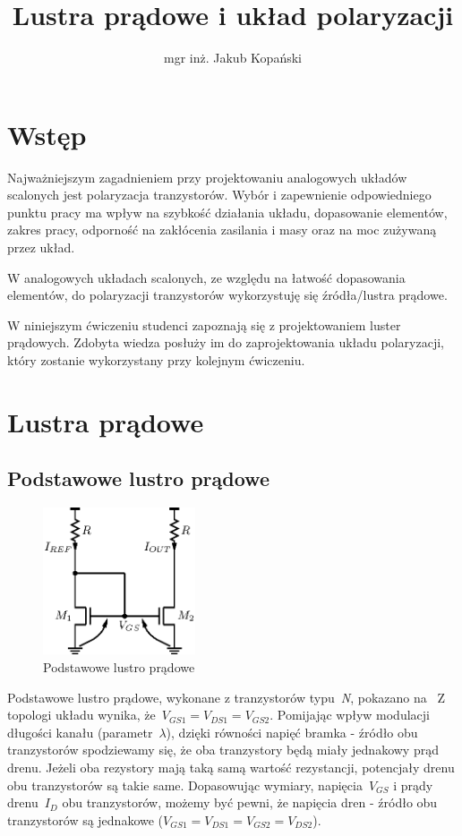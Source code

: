 \documentclass[twoside,pl,final]{labman}
\title{Lustra prądowe i układ polaryzacji}
\author{mgr inż. Jakub Kopański}
\begin{document}
\maketitle
\tableofcontents
\clearpage
\listoffigures
\clearpage
\listoftables
\clearpage

\chapter{Wstęp}
\label{intro}
Najważniejszym zagadnieniem przy projektowaniu
analogowych układów scalonych jest polaryzacja tranzystorów.
Wybór i zapewnienie odpowiedniego punktu pracy
ma wpływ na szybkość działania układu,
dopasowanie elementów, zakres pracy,
odporność na zakłócenia zasilania i masy
oraz na moc zużywaną przez układ.

W analogowych układach scalonych,
ze względu na łatwość dopasowania elementów,
do polaryzacji tranzystorów wykorzystuję się źródła/lustra prądowe.

W niniejszym ćwiczeniu studenci zapoznają się
z projektowaniem luster prądowych.
Zdobyta wiedza posłuży im do zaprojektowania układu polaryzacji,
który zostanie wykorzystany przy kolejnym ćwiczeniu.

\chapter{Lustra prądowe}
\label{mirror}

\section{Podstawowe lustro prądowe}
\label{mirror:basic}
\begin{figure}[!htbp]
  \centering
  \includegraphics[width=0.4\textwidth]{basic}
  \caption{Podstawowe lustro prądowe}
  \label{fig:basic}
\end{figure}

Podstawowe lustro prądowe,
wykonane z tranzystorów typu~\emph{N},
pokazano na~
Z topologi układu wynika, że~$V_{GS1} = V_{DS1} = V_{GS2}$.
Pomijając wpływ modulacji długości kanału (parametr~$\lambda$),
dzięki równości napięć bramka - źródło obu tranzystorów spodziewamy się,
że oba tranzystory będą miały jednakowy prąd drenu.
Jeżeli oba rezystory mają taką samą wartość rezystancji,
potencjały drenu obu tranzystorów są takie same.
Dopasowując wymiary, napięcia~$V_{GS}$ i prądy drenu~$I_D$ obu tranzystorów,
możemy być pewni, że napięcia dren - źródło obu tranzystorów są jednakowe
($V_{GS1} = V_{DS1} = V_{GS2} = V_{DS2}$).
\end{document}
